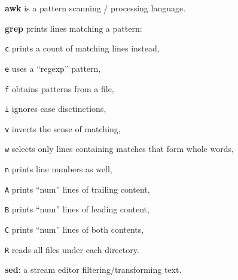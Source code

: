 \renewcommand\theFancyVerbLine{\normalsize\arabic{FancyVerbLine}}

\begin{enumx}
	\item [\cmd] \textbf{awk} is a pattern scanning / processing language.
\item [\cmd] \textbf{grep} prints lines matching a pattern:
\item [\texttt{c}] prints a count of matching lines instead,
\item [\texttt{e}] uses a ``regexp'' pattern,
\item [\texttt{f}] obtains patterns from a file,
\item [\texttt{i}] ignores case disctinctions,
\item [\texttt{v}] inverts the sense of matching,
\item [\texttt{w}] selects only lines containing matches that form whole words,
\item [\texttt{n}] prints line numbers as well,
\item [\texttt{A}] prints ``num'' lines of trailing content,
\item [\texttt{B}] prints ``num'' lines of leading content,
\item [\texttt{C}] prints ``num'' lines of both contents,
\item [\texttt{R}] reads all files under each directory.
\item [\cmd] \textbf{sed}: a stream editor filtering/transforming text.
\end{enumx}

